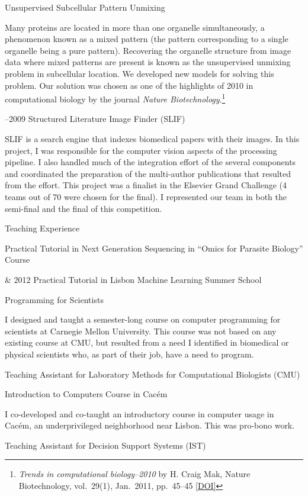 \documentclass{article}
\renewcommand\section[1]{%
    \par\vspace{2em}\penalty-100%
    {\subhead #1}%
    \par\penalty100\vspace{1em}\penalty100%
}
\newcommand\cvitem[2][\relax]{%
    \par\vspace{.8em}
    \if\relax#1\else{\Date \textcolor{medg}{#1}}\hspace{1em}\fi%
    {\CvItem #2}%
    \par\vspace{.4em}
}
\newcommand\showdoi[1]{%
    \href{http://dx.doi.org/#1}{[DOI]}%
}
\begin{document}
\cvitem[2010]{Unsupervised Subcellular Pattern Unmixing}
Many proteins are located in more than one organelle simultaneously, a
phenomenon known as a mixed pattern (the pattern corresponding to a single
organelle being a pure pattern). Recovering the organelle structure from image
data where mixed patterns are present is known as the unsupervised unmixing
problem in subcellular location. We developed new models for
solving this problem. Our solution was chosen as one of the highlights of 2010
in computational biology by the journal \emph{Nature Biotechnology}.\footnote{%
\emph{Trends in computational biology--2010} by H. Craig Mak, Nature
Biotechnology, vol.\ 29(1), Jan.\ 2011, pp.\ 45--45 \showdoi{10.1038/nbt.1747}}

\cvitem[2008--2009]{Structured Literature Image Finder (SLIF)}
SLIF is a search engine that indexes biomedical papers with their images. In
this project, I was responsible for the computer vision aspects of the
processing pipeline. I also handled much of the integration effort of the
several components and coordinated the preparation of the multi-author
publications that resulted from the effort. This project was a finalist in the
Elsevier Grand Challenge (4 teams out of 70 were chosen for the final). I
represented our team in both the semi-final and the final of this competition.

\break
\section{Teaching Experience}

\cvitem[2012]{Practical Tutorial in Next Generation Sequencing in ``Omics for Parasite Biology'' Course}
\cvitem[2011 \& 2012]{Practical Tutorial in Lisbon Machine Learning Summer School}

\cvitem[2009]{Programming for Scientists}
I designed and taught a semester-long course on computer programming for
scientists at Carnegie Mellon University. This course was not based on any
existing course at CMU, but resulted from a need I identified in biomedical or
physical scientists who, as part of their job, have a need to program.

\cvitem[2008]{Teaching Assistant for Laboratory Methods for Computational Biologists (CMU)}
\cvitem[2005]{Introduction to Computers Course in Cacém}
I co-developed and co-taught an introductory course in computer usage in
Cacém, an underprivileged neighborhood near Lisbon. This was pro-bono work.

\cvitem[2005]{Teaching Assistant for Decision Support Systems (IST)}
\end{document}
